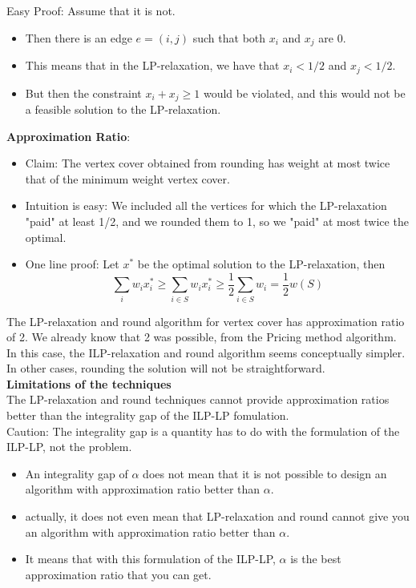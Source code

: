 \documentclass[onecolumn]{report}
\begin{document}
Easy Proof: Assume that it is not.
\begin{itemize}
    \item Then there is an edge $e=(i,j)$ such that both $x_i$ and $x_j$ are 0.
    \item This means that in the LP-relaxation, we have that $x_i < 1/2$ and $x_j < 1/2$.
    \item But then the constraint $x_i + x_j \geq 1$ would be violated, and this would not be a feasible solution to the LP-relaxation.
\end{itemize}
\textbf{Approximation Ratio}:
\begin{itemize}
    \item Claim: The vertex cover obtained from rounding has weight at most twice that of the minimum weight vertex cover.
    \item Intuition is easy: We included all the vertices for which the LP-relaxation "paid" at least 1/2, and we rounded them to 1, so we "paid" at most twice the optimal.
    \item One line proof: Let $x^*$ be the optimal solution to the LP-relaxation, then
    \begin{equation*}
        \sum_i w_i x_i^* \geq \sum_{i \in S} w_i x_i^* \geq \frac{1}{2} \sum_{i \in S} w_i = \frac{1}{2} w(S)
    \end{equation*}
\end{itemize}
The LP-relaxation and round algorithm for vertex cover has approximation ratio of 2. We already know that 2 was possible, from the Pricing method algorithm. In this case, the ILP-relaxation and round algorithm seems conceptually simpler. In other cases, rounding the solution will not be straightforward.\\
\textbf{Limitations of the techniques}\\
The LP-relaxation and round techniques cannot provide approximation ratios better than the integrality gap of the ILP-LP fomulation.\\
Caution: The integrality gap is a quantity has to do with the formulation of the ILP-LP, not the problem.
\begin{itemize}
    \item An integrality gap of $\alpha$ does not mean that it is not possible to design an algorithm with approximation ratio better than $\alpha$.
    \item actually, it does not even mean that LP-relaxation and round cannot give you an algorithm with approximation ratio better than $\alpha$.
    \item It means that with this formulation of the ILP-LP, $\alpha$ is the best approximation ratio that you can get.
\end{itemize}
\end{document}
